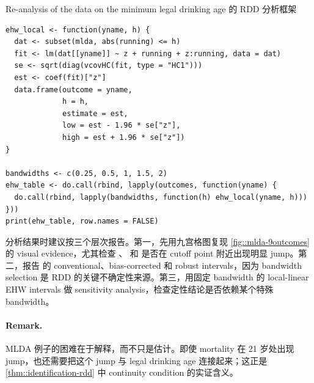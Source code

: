 \begin{exercisesolution}{Re-analysis of the data on the minimum legal drinking age}{ 的 RDD 分析框架}
\begin{lstlisting}
ehw_local <- function(yname, h) {
  dat <- subset(mlda, abs(running) <= h)
  fit <- lm(dat[[yname]] ~ z + running + z:running, data = dat)
  se <- sqrt(diag(vcovHC(fit, type = "HC1")))
  est <- coef(fit)["z"]
  data.frame(outcome = yname,
             h = h,
             estimate = est,
             low = est - 1.96 * se["z"],
             high = est + 1.96 * se["z"])
}

bandwidths <- c(0.25, 0.5, 1, 1.5, 2)
ehw_table <- do.call(rbind, lapply(outcomes, function(yname) {
  do.call(rbind, lapply(bandwidths, function(h) ehw_local(yname, h)))
}))
print(ehw_table, row.names = FALSE)
\end{lstlisting}

分析结果时建议按三个层次报告。第一，先用九宫格图复现 \cref{fig::mlda-9outcomes} 的 visual evidence，尤其检查 、 和  是否在 cutoff point 附近出现明显 jump。第二，报告  的 conventional、bias-corrected 和 robust intervals，因为 bandwidth selection 是 RDD 的关键不确定性来源。第三，用固定 bandwidth 的 local-linear EHW intervals 做 sensitivity analysis，检查定性结论是否依赖某个特殊 bandwidth。

\paragraph{Remark.}
MLDA 例子的困难在于解释，而不只是估计。即使 mortality 在 21 岁处出现 jump，也还需要把这个 jump 与 legal drinking age 连接起来；这正是 \cref{thm::identification-rdd} 中 continuity condition 的实证含义。
\end{exercisesolution}

